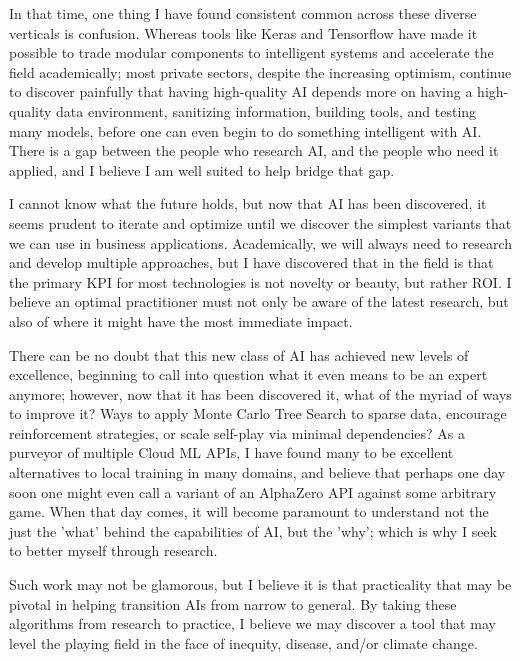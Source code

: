 \documentclass[11pt, a4paper]{awesome-cv}
\begin{document}
\begin{cvletter}
In that time, one thing I have found consistent common across these diverse
verticals is confusion. Whereas tools like Keras and Tensorflow have made it
possible to trade modular components to intelligent systems and accelerate the
field academically; most private sectors, despite the increasing optimism,
continue to discover painfully that having high-quality AI depends more on
having a high-quality data environment, sanitizing information, building tools,
and testing many models, before one can even begin to do something
intelligent with AI. There is a gap between the people who
research AI, and the people who need it applied, and I believe I am well suited
to help bridge that gap.

I cannot know what the future holds, but now that AI has been discovered, it seems prudent to iterate and optimize until we discover the simplest variants that we can use in business
applications.  Academically, we will always need to research and develop
multiple approaches, but I have discovered that in the field is that the primary
KPI for most technologies is not novelty or beauty, but rather ROI. I believe an
optimal practitioner must not only be aware of the latest research, but also
of where it might have the most immediate impact.

There can be no doubt that this new class of AI has achieved new levels of
excellence, beginning to call into question what it even means to be an expert
anymore; however, now that it has been discovered it, what of the myriad of ways
to improve it? Ways to apply Monte Carlo Tree Search to sparse data, encourage
reinforcement strategies, or scale self-play via minimal dependencies? As a
purveyor of multiple Cloud ML APIs, I have found many to be excellent
alternatives to local training in many domains, and believe that perhaps one day
soon one might even call a variant of an AlphaZero API against some arbitrary
game. When that day comes, it will become paramount to understand not the just
the 'what' behind the capabilities of AI, but the 'why'; which is why I seek to
better myself through research.

Such work may not be glamorous, but I believe it is that practicality that may
be pivotal in helping transition AIs from narrow to general. By taking these
algorithms from research to practice, I believe we may discover a tool that
may level the playing field in the face of inequity, disease, and/or climate change.




\end{cvletter}
\end{document}
